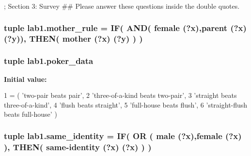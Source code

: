 ; Section 3\+: Survey \#\# Please answer these questions inside the double quotes. 

\hypertarget{namespacelab1_ab6b172e48334828812e03a3a574b30e2}{}
\subsubsection[{mother\+\_\+rule}]{\setlength{\rightskip}{0pt plus 5cm}tuple lab1.\+mother\+\_\+rule = {\bf I\+F}( {\bf A\+N\+D}( \textquotesingle{}female (?x)\textquotesingle{},\textquotesingle{}parent (?x) (?y)\textquotesingle{}), {\bf T\+H\+E\+N}( \textquotesingle{}mother (?x) (?y)\textquotesingle{} ) )}\label{namespacelab1_ab6b172e48334828812e03a3a574b30e2}
\hypertarget{namespacelab1_ad37cc74f3655cd6ec628ac88c1e7853d}{}
\subsubsection[{poker\+\_\+data}]{\setlength{\rightskip}{0pt plus 5cm}tuple lab1.\+poker\+\_\+data}\label{namespacelab1_ad37cc74f3655cd6ec628ac88c1e7853d}
{\bfseries Initial value\+:}
\begin{DoxyCode}
1 = ( \textcolor{stringliteral}{'two-pair beats pair'},
2                \textcolor{stringliteral}{'three-of-a-kind beats two-pair'},
3                \textcolor{stringliteral}{'straight beats three-of-a-kind'},
4                \textcolor{stringliteral}{'flush beats straight'},
5                \textcolor{stringliteral}{'full-house beats flush'},
6                \textcolor{stringliteral}{'straight-flush beats full-house'} )
\end{DoxyCode}
\hypertarget{namespacelab1_a898e66c595856ca61d7a684347e1587d}{}
\subsubsection[{same\+\_\+identity}]{\setlength{\rightskip}{0pt plus 5cm}tuple lab1.\+same\+\_\+identity = {\bf I\+F}( {\bf O\+R} ( \textquotesingle{}male (?x)\textquotesingle{},\textquotesingle{}female (?x)\textquotesingle{} ), {\bf T\+H\+E\+N}( \textquotesingle{}same-\/identity (?x) (?x)\textquotesingle{} ) )}\label{namespacelab1_a898e66c595856ca61d7a684347e1587d}
\hypertarget{namespacelab1_af339432da6bd451c07808024dae9fc1b}{}
